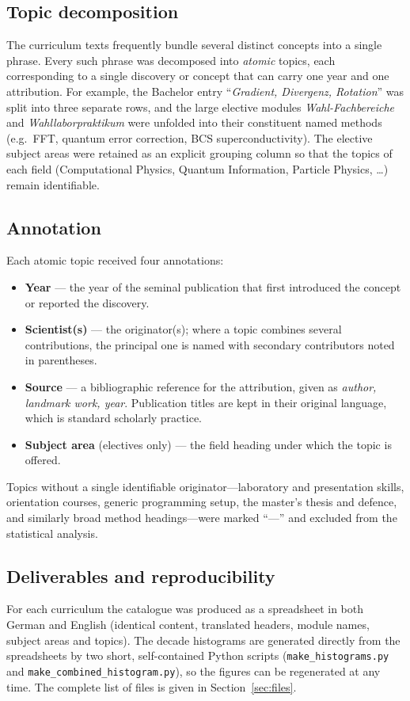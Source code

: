 \documentclass[11pt,a4paper]{article}
\begin{document}
\subsection{Topic decomposition}
The curriculum texts frequently bundle several distinct concepts into a single
phrase. Every such phrase was decomposed into \emph{atomic} topics, each
corresponding to a single discovery or concept that can carry one year and one
attribution. For example, the Bachelor entry
``\textit{Gradient, Divergenz, Rotation}'' was split into three separate rows,
and the large elective modules \textit{Wahl-Fachbereiche} and
\textit{Wahllaborpraktikum} were unfolded into their constituent named methods
(e.g.\ FFT, quantum error correction, BCS superconductivity). The elective
subject areas were retained as an explicit grouping column so that the topics of
each field (Computational Physics, Quantum Information, Particle Physics, \dots)
remain identifiable.

\subsection{Annotation}
Each atomic topic received four annotations:
\begin{itemize}
  \item \textbf{Year} --- the year of the seminal publication that first
        introduced the concept or reported the discovery.
  \item \textbf{Scientist(s)} --- the originator(s); where a topic combines
        several contributions, the principal one is named with secondary
        contributors noted in parentheses.
  \item \textbf{Source} --- a bibliographic reference for the attribution,
        given as \emph{author, landmark work, year}. Publication titles are kept
        in their original language, which is standard scholarly practice.
  \item \textbf{Subject area} (electives only) --- the field heading under which
        the topic is offered.
\end{itemize}
Topics without a single identifiable originator---laboratory and presentation
skills, orientation courses, generic programming setup, the master's thesis and
defence, and similarly broad method headings---were marked ``---'' and excluded
from the statistical analysis.

\subsection{Deliverables and reproducibility}
For each curriculum the catalogue was produced as a spreadsheet in both German
and English (identical content, translated headers, module names, subject areas
and topics). The decade histograms are generated directly from the spreadsheets
by two short, self-contained Python scripts
(\texttt{make\_histograms.py} and \texttt{make\_combined\_histogram.py}), so the
figures can be regenerated at any time. The complete list of files is given in
Section~\ref{sec:files}.
\end{document}
